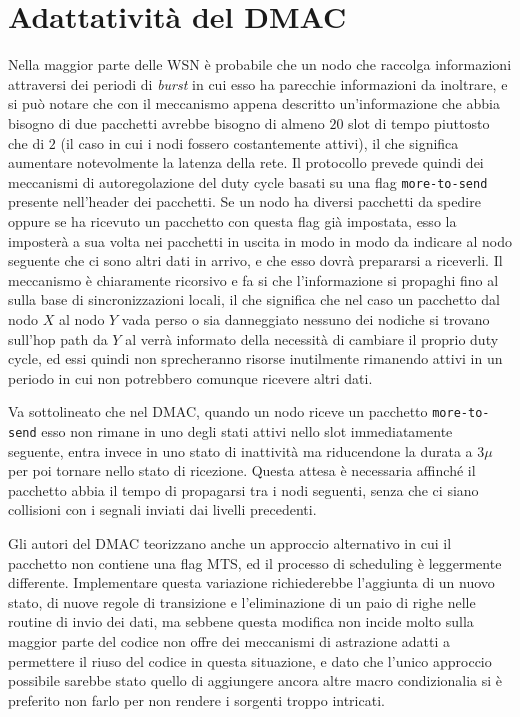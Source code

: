 \documentclass[twoside,11pt,a4paper,italian,openany]{book}
\begin{document}
\section{Adattatività del DMAC}
Nella maggior parte delle WSN è probabile che un nodo che raccolga informazioni attraversi dei
periodi di \emph{burst} in cui esso ha parecchie informazioni da inoltrare, e si può notare che 
con il meccanismo appena descritto un'informazione che abbia bisogno di due pacchetti avrebbe 
bisogno di almeno $20$ slot di tempo piuttosto che di $2$ (il caso in cui i nodi fossero 
costantemente attivi), il che significa aumentare notevolmente la latenza della rete. 
Il protocollo prevede quindi dei meccanismi di autoregolazione del duty cycle basati su una flag 
\texttt{more-to-send} presente nell'header dei pacchetti. 
Se un nodo ha diversi pacchetti da spedire oppure se ha ricevuto un pacchetto con questa flag
già impostata, esso la imposterà a sua volta nei pacchetti in uscita in modo in modo da 
indicare al nodo seguente che ci sono altri dati in arrivo, e che esso dovrà prepararsi a 
riceverli. Il meccanismo è chiaramente ricorsivo e fa si che l'informazione si propaghi fino 
al \sink sulla base di sincronizzazioni locali, il che significa che nel caso un pacchetto dal 
nodo $X$ al nodo $Y$ vada perso o sia danneggiato nessuno dei nodiche si trovano sull'hop path da
$Y$ al \sink verrà informato della necessità di cambiare il proprio duty cycle, ed essi quindi 
non sprecheranno risorse inutilmente rimanendo attivi in un periodo in cui non potrebbero 
comunque ricevere altri dati. 


Va sottolineato che nel DMAC, quando un nodo riceve un pacchetto \texttt{more-to-send} esso non 
rimane in uno degli stati attivi nello slot immediatamente seguente, entra invece in uno stato di
inattività ma riducendone la durata a  
$3\mu$ per poi tornare nello stato di ricezione. Questa attesa è necessaria affinché il 
pacchetto abbia il tempo di propagarsi tra i nodi seguenti, senza che ci siano collisioni con i
segnali inviati dai livelli precedenti. 

Gli autori del DMAC teorizzano anche un approccio alternativo in cui il pacchetto non contiene 
una flag MTS,  ed il processo di scheduling è leggermente differente. 
Implementare questa variazione richiederebbe l'aggiunta di un nuovo stato, di 
nuove regole di transizione e l'eliminazione di un paio di righe nelle routine di invio dei dati,
ma sebbene questa modifica non incide molto sulla maggior parte del codice \nesc non offre dei 
meccanismi di astrazione adatti a permettere il riuso del codice in questa situazione, e dato 
che l'unico approccio possibile sarebbe stato quello di aggiungere ancora altre macro 
condizionalia si è preferito non farlo per non rendere i sorgenti troppo intricati. 
\end{document}
